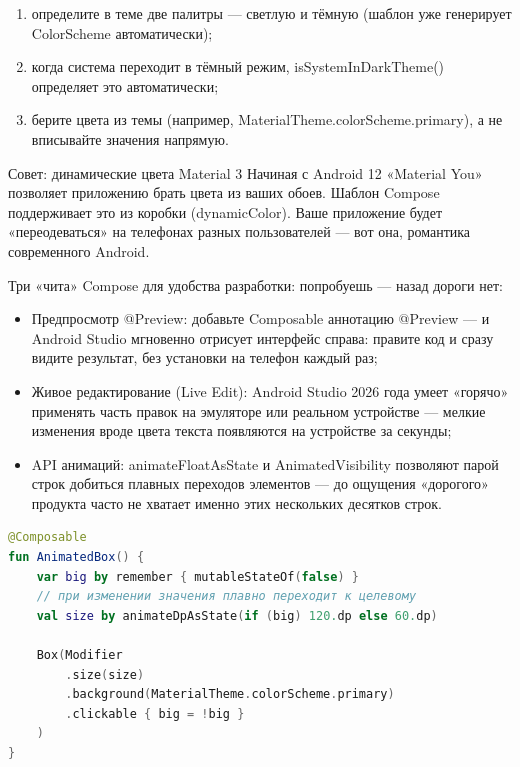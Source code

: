 \begin{enumerate}
  \item определите в теме две палитры — светлую и тёмную (шаблон уже генерирует ColorScheme автоматически);
  \item когда система переходит в тёмный режим, isSystemInDarkTheme() определяет это автоматически;
  \item берите цвета из темы (например, MaterialTheme.colorScheme.primary), а не вписывайте значения напрямую.
\end{enumerate}

\begin{tcbinfo}{Совет: динамические цвета Material 3}
Начиная с Android 12 «Material You» позволяет приложению брать цвета из ваших обоев. Шаблон Compose поддерживает это из коробки (dynamicColor). Ваше приложение будет «переодеваться» на телефонах разных пользователей — вот она, романтика современного Android.

\end{tcbinfo}


Три «чита» Compose для удобства разработки: попробуешь — назад дороги нет:

\begin{itemize}
  \item Предпросмотр @Preview: добавьте Composable аннотацию @Preview — и Android Studio мгновенно отрисует интерфейс справа: правите код и сразу видите результат, без установки на телефон каждый раз;
  \item Живое редактирование (Live Edit): Android Studio 2026 года умеет «горячо» применять часть правок на эмуляторе или реальном устройстве — мелкие изменения вроде цвета текста появляются на устройстве за секунды;
  \item API анимаций: animateFloatAsState и AnimatedVisibility позволяют парой строк добиться плавных переходов элементов — до ощущения «дорогого» продукта часто не хватает именно этих нескольких десятков строк.
\end{itemize}

\begin{lstlisting}[language=Kotlin]
@Composable
fun AnimatedBox() {
    var big by remember { mutableStateOf(false) }
    // при изменении значения плавно переходит к целевому
    val size by animateDpAsState(if (big) 120.dp else 60.dp)

    Box(Modifier
        .size(size)
        .background(MaterialTheme.colorScheme.primary)
        .clickable { big = !big }
    )
}
\end{lstlisting}

